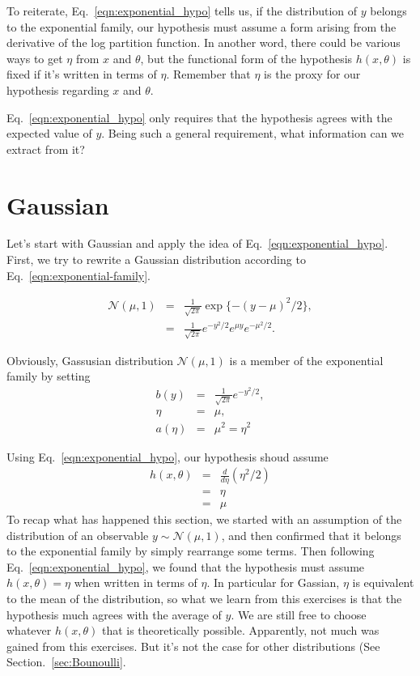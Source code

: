 To reiterate, Eq.~\ref{eqn:exponential_hypo} tells us, if the distribution of $y$ belongs to the exponential family, our hypothesis must assume a form arising from the derivative of the log partition function. In another word, there could be various ways to get $\eta$ from $x$ and $\theta$, but the functional form of the hypothesis $h(x, \theta)$ is fixed if it's written in terms of $\eta$. Remember that $\eta$ is the proxy for our hypothesis regarding $x$ and $\theta$.

Eq.~\ref{eqn:exponential_hypo} only requires that the hypothesis agrees with the expected value of $y$. Being such a general requirement, what information can we extract from it?

\section{Gaussian}
Let's start with Gaussian and apply the idea of Eq.~\ref{eqn:exponential_hypo}. First, we try to rewrite a Gaussian distribution according to Eq.~\ref{eqn:exponential-family}.

\begin{eqnarray}
	\mathcal N(\mu, 1)&=&\frac{1}{\sqrt{2\pi}}\exp\{-(y-\mu)^2/2\},\\
		   &=&\frac{1}{\sqrt{2\pi}}e^{-y^2/2}e^{\mu y}e^{-\mu^2/2}.
\end{eqnarray}

Obviously, Gassusian distribution $\mathcal N(\mu, 1)$ is a member of the exponential family by setting
\begin{eqnarray}
	b(y)&=&\frac{1}{\sqrt{2\pi}}e^{-y^2/2},\\
	\eta&=&\mu,\\
	a(\eta)&=&\mu^2 = \eta^2
\end{eqnarray}

Using Eq.~\ref{eqn:exponential_hypo}, our hypothesis shoud assume
\begin{eqnarray}
	h(x, \theta) &=& \frac{d}{d\eta}(\eta^2/2)\\
		     &=& \eta\\
		     &=& \mu
\end{eqnarray}
To recap what has happened this section, we started with an assumption of the distribution of an observable $y\sim\mathcal N(\mu, 1)$, and then confirmed that it belongs to the exponential family by simply rearrange some terms. Then following Eq.~\ref{eqn:exponential_hypo}, we found that the hypothesis must assume $h(x, \theta)=\eta$ when written in terms of $\eta$. In particular for Gassian, $\eta$ is equivalent to the mean of the distribution, so what we learn from this exercises is that the hypothesis much agrees with the average of $y$. We are still free to choose whatever $h(x, \theta)$ that is theoretically possible. Apparently, not much was gained from this exercises. But it's not the case for other distributions (See Section.~\ref{sec:Bounoulli}.

